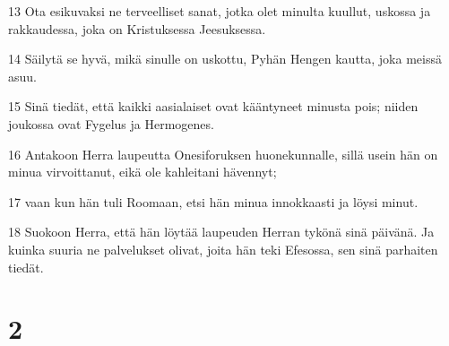 \par 13 Ota esikuvaksi ne terveelliset sanat, jotka olet minulta kuullut, uskossa ja rakkaudessa, joka on Kristuksessa Jeesuksessa.
\par 14 Säilytä se hyvä, mikä sinulle on uskottu, Pyhän Hengen kautta, joka meissä asuu.
\par 15 Sinä tiedät, että kaikki aasialaiset ovat kääntyneet minusta pois; niiden joukossa ovat Fygelus ja Hermogenes.
\par 16 Antakoon Herra laupeutta Onesiforuksen huonekunnalle, sillä usein hän on minua virvoittanut, eikä ole kahleitani hävennyt;
\par 17 vaan kun hän tuli Roomaan, etsi hän minua innokkaasti ja löysi minut.
\par 18 Suokoon Herra, että hän löytää laupeuden Herran tykönä sinä päivänä. Ja kuinka suuria ne palvelukset olivat, joita hän teki Efesossa, sen sinä parhaiten tiedät.

\chapter{2}

